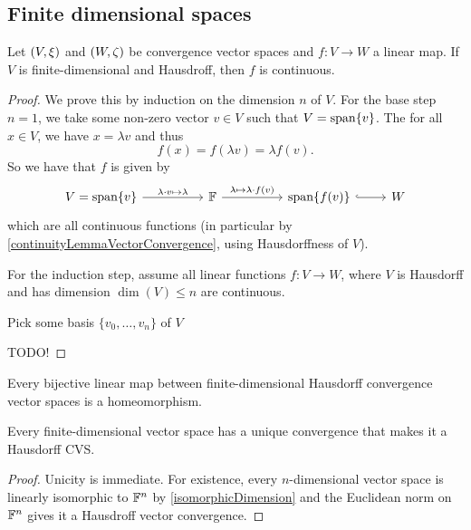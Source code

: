 \subsection{Finite dimensional spaces}
\begin{proposition}
Let $\left( V,\xi \right)$ and $\left( W,\zeta \right)$ be convergence vector spaces and $f: V\to W$ a linear map. If $V$ is finite-dimensional and Hausdroff, then $f$ is continuous.
\end{proposition}
\begin{proof}
We prove this by induction on the dimension $n$ of $V$. For the base step $n=1$, we take some non-zero vector $v\in V$ such that $V = \operatorname{span}\{v\}$. The for all $x\in V$, we have $x= \lambda v$ and thus
\[ f(x) = f(\lambda v) = \lambda f(v). \]
So we have that $f$ is given by
\[ \begin{tikzcd}
V = \Span\{v\} \arrow[rr, "\lambda\cdot v\mapsto \lambda"] && \F \arrow[rr, "\lambda\mapsto \lambda \cdot f(v)"] && \Span\{f(v)\} \arrow[r, hook] & W
\end{tikzcd} \]
which are all continuous functions (in particular by \ref{continuityLemmaVectorConvergence}, using Hausdorffness of $V$).

For the induction step, assume all linear functions $f: V\to W$, where $V$ is Hausdorff and has dimension $\dim(V)\leq n$ are continuous.

Pick some basis $\{v_0, \ldots, v_n\}$ of $V$ 

TODO!
\end{proof}
\begin{corollary} \label{finiteDimensionalHausdorffLinearBijectionIsHomeomorphism}
Every bijective linear map between finite-dimensional Hausdorff convergence vector spaces is a homeomorphism.
\end{corollary}
\begin{corollary}
Every finite-dimensional vector space has a unique convergence that makes it a Hausdorff CVS.
\end{corollary}
\begin{proof}
Unicity is immediate. For existence, every $n$-dimensional vector space is linearly isomorphic to $\mathbb{F}^n$ by \ref{isomorphicDimension} and the Euclidean norm on $\mathbb{F}^n$ gives it a Hausdroff vector convergence. 
\end{proof}

